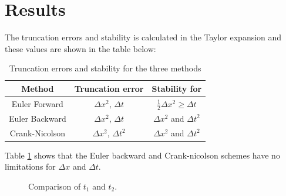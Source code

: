 \documentclass[10pt,a4paper]{article}
\begin{document}
\section*{Results}


\noindent The truncation errors and stability is calculated in the Taylor expansion and these values are shown in the table below:


\begin{table}[H]
\centering
\caption{Truncation errors and stability for the three methods}
\begin{tabular}{|c|c|c|}
\hline
Method & Truncation error & Stability for\\
\hline
Euler Forward & $\Delta x^2$, $\Delta t$ & $\frac{1}{2} \Delta x^2 \geq \Delta t$\\
\hline
Euler Backward & $\Delta x^2$, $\Delta t$ & $\Delta x^2$ and $\Delta t^2$\\
\hline
Crank-Nicolson & $\Delta x^2$, $\Delta t^2$ & $\Delta x^2$ and $\Delta t^2$\\
\hline
\end{tabular}
\label{truncstab}
\end{table}
 

\noindent Table \ref{truncstab} shows that the Euler backward and Crank-nicolson schemes have no limitations for $\Delta x$ and $\Delta t$. 


\begin{figure}[H]
 	\centering
  	\caption{\label{fig:methods10}Comparison of $t_1$ and $t_2$.}
\end{figure}
\end{document}

